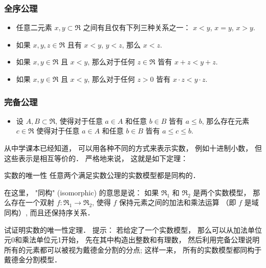\subsubsection{全序公理}
\begin{itemize}
\item 任意二元素 $x,y\subset\mathfrak{R}$ 之间有且仅有下列三种关系之一： $x<y$, $x=y$, $x>y$.
\item 如果 $x,y,z\in\mathfrak{R}$ 且有 $x<y$, $y<z$, 那么 $x<z$.
\item 如果 $x,y\in\mathfrak{R}$ 且 $x<y$, 那么对于任何 $z\in\mathfrak{R}$ 皆有 $x+z<y+z$.
\item 如果 $x,y\in\mathfrak{R}$ 且 $x<y$, 那么对于任何 $z>0$ 皆有 $x\cdot z<y\cdot z$.
\end{itemize}

\subsubsection{完备公理}
\begin{itemize}
\item 设 $A,B\subset\mathfrak{R}$, 使得对于任意 $a\in A$ 和任意 $b\in B$ 皆有 $a\leq b$, 那么存在元素 $c\in\mathfrak{R}$ 使得对于任意 $a\in A$ 和任意 $b\in B$ 皆有 $a\leq c\leq b$.
\end{itemize}

从中学课本已经知道， 可以用各种不同的方式来表示实数， 例如十进制小数， 但这些表示是相互等价的． 严格地来说， 这就是如下定理：
\begin{theorem}{实数的唯一性}
任意两个满足实数公理的实数模型都是同构的．
\end{theorem}
在这里， "同构" (isomorphic) 的意思是说： 如果 $\mathfrak{R}_1$ 和 $\mathfrak{R}_2$ 是两个实数模型， 那么存在一个双射 $f:\mathfrak{R}_1\to \mathfrak{R}_2$, 使得 $f$ 保持元素之间的加法和乘法运算 （即 $f$ 是域同构）, 而且还保持序关系．

\begin{exercise}{}
试证明实数的唯一性定理． 提示： 若给定了一个实数模型， 那么可以从加法单位元0和乘法单位元1开始， 先在其中构造出整数和有理数， 然后利用完备公理说明所有的元素都可以被视为戴德金分割的分点; 这样一来， 所有的实数模型都同构于戴德金分割模型．
\end{exercise}